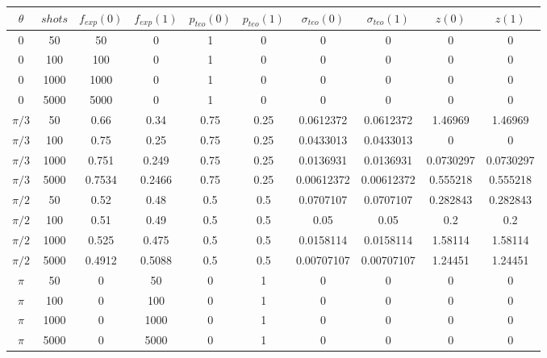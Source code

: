 \documentclass[11pt, a4paper, twocolumn]{article}
\begin{document}
\begin{table}
	

\begin{tabular}{cccccccccc}
\hline
   $\theta$ &   $shots$ &   $f_{exp}(0)$ &   $f_{exp}(1)$ &   $p_{teo}(0)$ &   $p_{teo}(1)$ &   $\sigma_{teo}(0)$ &   $\sigma_{teo}(1)$ &   $z(0)$ &   $z(1)$ \\
\hline
 0       &      50 &          50 &         0 &      1    &      0    &    0          &    0          &     0         &     0         \\
 0       &     100 &       100 &         0 &      1    &      0    &    0          &    0          &     0         &     0         \\
 0       &    1000 &      1000 &         0 &      1    &      0    &    0          &    0          &     0         &     0         \\
 0       &    5000 &      5000 &         0 &      1    &      0    &    0          &    0          &     0         &     0         \\
 $\pi/3$  &      50 &    0.66   &    0.34   &      0.75 &      0.25 &    0.0612372  &    0.0612372  &       1.46969   &       1.46969   \\
  $\pi/3$   &     100 &    0.75   &    0.25   &      0.75 &      0.25 &    0.0433013  &    0.0433013  &       0         &       0         \\
 $\pi/3$   &    1000 &    0.751  &    0.249  &      0.75 &      0.25 &    0.0136931  &    0.0136931  &       0.0730297 &       0.0730297 \\
  $\pi/3$  &    5000 &    0.7534 &    0.2466 &      0.75 &      0.25 &    0.00612372 &    0.00612372 &       0.555218  &       0.555218  \\
  $\pi/2$  &      50 &    0.52   &    0.48   &      0.5  &      0.5  &    0.0707107  &    0.0707107  &       0.282843  &       0.282843  \\
 $\pi/2$  &     100 &    0.51   &    0.49   &      0.5  &      0.5  &    0.05       &    0.05       &       0.2       &       0.2       \\
 $\pi/2$  &    1000 &    0.525  &    0.475  &      0.5  &      0.5  &    0.0158114  &    0.0158114  &       1.58114   &       1.58114   \\
 $\pi/2$  &    5000 &    0.4912 &    0.5088 &      0.5  &      0.5  &    0.00707107 &    0.00707107 &       1.24451   &       1.24451   \\
 $\pi$ &      50 &         0 &        50 &      0    &      1    &    0          &    0          &     0         &     0         \\
 $\pi$ &     100 &         0 &       100 &      0    &      1    &    0          &    0          &     0         &     0         \\
 $\pi$ &    1000 &         0 &      1000 &      0    &      1    &    0          &    0          &     0         &     0         \\
 $\pi$&    5000 &         0 &      5000 &      0    &      1    &    0          &    0          &     0         &     0         \\
\hline


\end{tabular}
\end{table}
\end{document}
